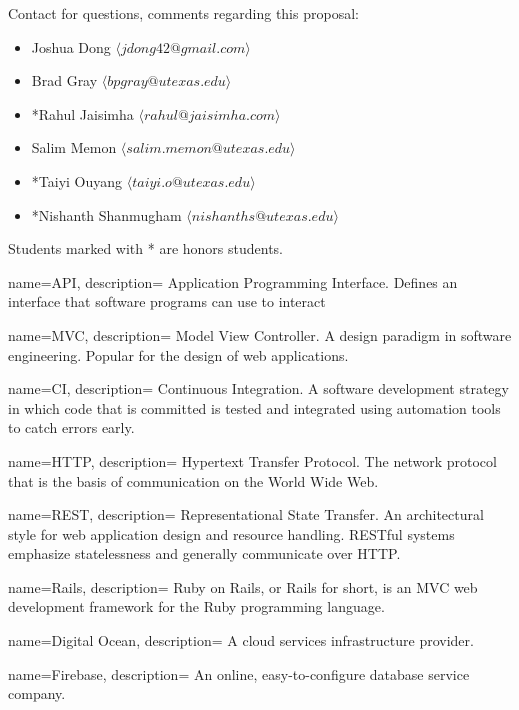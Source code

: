 \documentclass{article}
\begin{document}
Contact for questions, comments regarding this proposal: 

\begin{itemize}
    \item Joshua Dong $\langle jdong42@gmail.com \rangle$
    \item Brad Gray $\langle bpgray@utexas.edu \rangle$
    \item *Rahul Jaisimha $\langle rahul@jaisimha.com \rangle$


\item Salim Memon $\langle salim.memon@utexas.edu  \rangle$
    \item *Taiyi Ouyang $\langle taiyi.o@utexas.edu \rangle$
    \item *Nishanth Shanmugham $\langle nishanths@utexas.edu \rangle$
\end{itemize}

Students marked with * are honors students.

{
  name=API,
  description={
    Application Programming Interface. Defines an interface that software programs can use to interact
  }
}

{
  name=MVC,
  description={
    Model View Controller. A design paradigm in software engineering. Popular for the design of web applications.
  }
}

{
  name=CI,
  description={
    Continuous Integration. A software development strategy in which code that is committed is tested and integrated using automation tools to catch errors early.
  }
}

{
  name=HTTP,
  description={
    Hypertext Transfer Protocol. The network protocol that is the basis of communication on the World Wide Web.
  }
}

{
  name=REST,
  description={
    Representational State Transfer. An architectural style for web application design and resource handling. RESTful systems emphasize statelessness and generally communicate over HTTP.
  }
}

{
  name=Rails,
  description={
    Ruby on Rails, or Rails for short, is an MVC web development framework for the Ruby programming language.
  }
}

{
  name=Digital Ocean,
  description={
    A cloud services infrastructure provider.
  }
}

{
  name=Firebase,
  description={
    An online, easy-to-configure database service company.
  }
}
\end{document}

